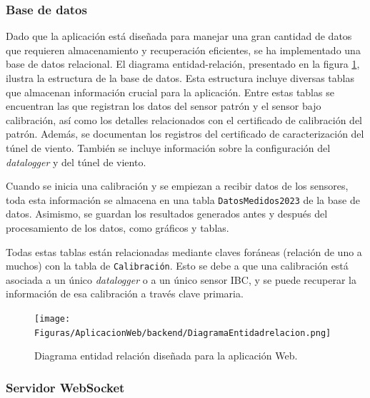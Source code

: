 \subsubsection{Base de datos}

Dado que la aplicación está diseñada para manejar una gran cantidad de datos que requieren almacenamiento y recuperación eficientes, se ha implementado una base de datos relacional. El diagrama entidad-relación, presentado en la figura \ref{fig:DiagramaEntidadRelacion}, ilustra la estructura de la base de datos. Esta estructura incluye diversas tablas que almacenan información crucial para la aplicación. Entre estas tablas se encuentran las que registran los datos del sensor patrón y el sensor bajo calibración, así como los detalles relacionados con el certificado de calibración del patrón. Además, se documentan los registros del certificado de caracterización del túnel de viento. También se incluye información sobre la configuración del \textit{datalogger} y del túnel de viento.


Cuando se inicia una calibración y se empiezan a recibir datos de los sensores, toda esta información se almacena en una tabla \texttt{DatosMedidos2023} de la base de datos. Asimismo, se guardan los resultados generados antes y después del procesamiento de los datos, como gráficos y tablas.

Todas estas tablas están relacionadas mediante claves foráneas (relación de uno a muchos) con la tabla de \texttt{Calibración}. Esto se debe a que una calibración está asociada a un único \textit{datalogger} o a un único sensor IBC, y se puede recuperar la información de esa calibración a través clave primaria.


\begin{figure}[H]
    \centering
    \texttt{[image: Figuras/AplicacionWeb/backend/DiagramaEntidadrelacion.png]}
    \caption{Diagrama entidad relación diseñada para la aplicación Web.}
    \label{fig:DiagramaEntidadRelacion}
\end{figure}

\subsubsection{Servidor WebSocket}

